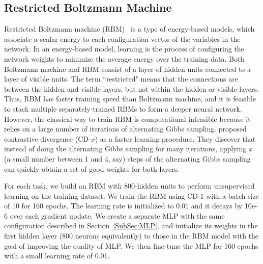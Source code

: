 \subsection{Restricted Boltzmann Machine}
Restricted Boltzmann machine (RBM)~\cite{DeepBeliefNets} is a type of energy-based models, which associate a scalar energy to each configuration vector of the variables in the network.
In an energy-based model, learning is the process of configuring the network weights to minimize the average energy over the training data.
Both Boltzmann machine and RBM consist of a layer of hidden units connected to a layer of visible units.
The term ``restricted" means that the connections are between the hidden and visible layers, but not within the hidden or visible layers.
Thus, RBM has faster training speed than Boltzmann machine, and it is feasible to stack multiple separately-trained RBMs to form a deeper neural network.
However, the classical way to train RBM is computational infeasible because it relies on a large number of iterations of alternating Gibbs sampling.
\cite{DeepBeliefNets} proposed contrastive divergence (CD-$x$) as a faster learning procedure.
They discover that instead of doing the alternating Gibbs sampling for many iterations,
applying $x$ (a small number between 1 and 4, say) steps of the alternating Gibbs sampling can quickly obtain a set of good weights for both layers.

For each task, we build an RBM with 800-hidden units to perform unsupervised learning on the training dataset.
We train the RBM using CD-1 with a batch size of 10 for 160 epochs.
The learning rate is initialized to 0.01 and it decays by 10e-6 over each gradient update.
We create a separate MLP with the same configuration described in Section~\ref{SubSec:MLP}, and initialize its weights in the first hidden layer (800 neurons equivalently) to those in the RBM model with the goal of improving the quality of MLP.
We then fine-tune the MLP for 160 epochs with a small learning rate of 0.01.


